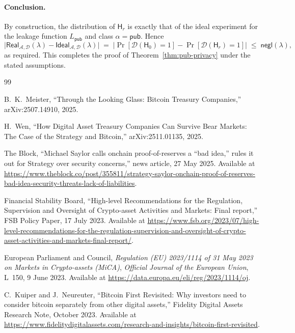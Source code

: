 \documentclass[11pt]{article}
\begin{document}
\paragraph{Conclusion.}
By construction, the distribution of $\mathsf{H}_r$ is exactly that of the
ideal experiment for the leakage function $L_{\mathsf{pub}}$ and class
$\alpha=\mathsf{pub}$.
Hence
\[
  \bigl|\mathsf{Real}_{\mathcal{A},\mathcal{D}}(\lambda)
        - \mathsf{Ideal}_{\mathcal{A},\mathcal{D}}(\lambda)\bigr|
  \;=\;
  \bigl|\Pr[\mathcal{D}(\mathsf{H}_0)=1] - \Pr[\mathcal{D}(\mathsf{H}_r)=1]\bigr|
  \;\leq\; \mathsf{negl}(\lambda),
\]
as required.
This completes the proof of Theorem~\ref{thm:pub-privacy} under the stated
assumptions.

\begin{thebibliography}{99}

  B.~K.~Meister,
  ``Through the Looking Glass: Bitcoin Treasury Companies,''
  arXiv:2507.14910, 2025.
  
  H.~Wen,
  ``How Digital Asset Treasury Companies Can Survive Bear Markets:
  The Case of the Strategy and Bitcoin,''
  arXiv:2511.01135, 2025.
  
  The Block,
  ``Michael Saylor calls onchain proof-of-reserves a ``bad idea,''
  rules it out for Strategy over security concerns,''
  news article, 27 May 2025.
  Available at
  \url{https://www.theblock.co/post/355811/strategy-saylor-onchain-proof-of-reserves-bad-idea-security-threats-lack-of-liabilities}.
  
  Financial Stability Board,
  ``High-level Recommendations for the Regulation, Supervision and
  Oversight of Crypto-asset Activities and Markets: Final report,''
  FSB Policy Paper, 17 July 2023.
  Available at
  \url{https://www.fsb.org/2023/07/high-level-recommendations-for-the-regulation-supervision-and-oversight-of-crypto-asset-activities-and-markets-final-report/}.
  
  European Parliament and Council,
  \emph{Regulation (EU) 2023/1114 of 31 May 2023 on Markets in Crypto-assets (MiCA)},
  \emph{Official Journal of the European Union}, L~150, 9 June 2023.
  Available at \url{https://data.europa.eu/eli/reg/2023/1114/oj}.
  
  C.~Kuiper and J.~Neureuter,
  ``Bitcoin First Revisited: Why investors need to consider bitcoin
  separately from other digital assets,''
  Fidelity Digital Assets Research Note, October 2023.
  Available at
  \url{https://www.fidelitydigitalassets.com/research-and-insights/bitcoin-first-revisited}.
  

\end{thebibliography}
\end{document}
